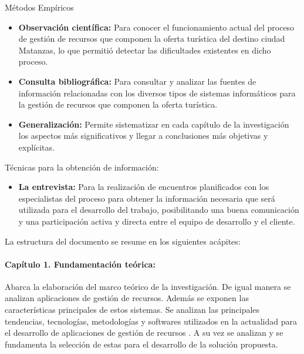 Métodos Empíricos

\begin{itemize}
	\item \textbf{Observación científica:} Para conocer el funcionamiento actual del proceso de gestión de recursos que componen la oferta turística del destino ciudad Matanzas, lo que permitió detectar las dificultades existentes en dicho proceso.
	\item \textbf{Consulta bibliográfica:} Para consultar y analizar las fuentes de información relacionadas con los diversos tipos de sistemas informáticos para la gestión de recursos que componen la oferta turística.
	
	\item \textbf{Generalización:} Permite sistematizar en cada capítulo de la investigación los aspectos más significativos y llegar a conclusiones más objetivas y explícitas.
\end{itemize}

Técnicas para la obtención de información:

\begin{itemize}
	\item \textbf{La entrevista:} Para la realización de encuentros planificados con los especialistas del proceso para obtener la información necesaria que será utilizada para el desarrollo del trabajo, posibilitando una buena comunicación y una participación activa y directa entre el equipo de desarrollo y el cliente.
	
\end{itemize}

La estructura del documento se resume en los siguientes acápites:

\paragraph*{Capítulo 1. Fundamentación teórica:} Abarca la elaboración del marco teórico de la investigación. De igual manera se analizan aplicaciones de gestión de recursos. Además se exponen las características principales de estos sistemas. Se analizan las principales tendencias, tecnologías, metodologías y softwares utilizados en la actualidad para el desarrollo de aplicaciones de gestión de recursos . A su vez se analizan y se fundamenta la selección de estas para el desarrollo de la solución propuesta. 


